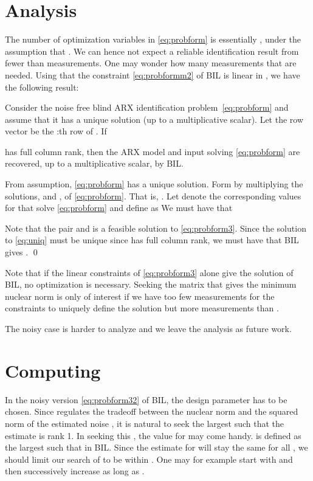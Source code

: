 \documentclass{ifacconf}
\newcommand{\0}{{\bf 0}}
\begin{document}
\section{Analysis}
The number of optimization variables  in \eqref{eq:probform} is
essentially , under the assumption that . We can
hence not expect a  reliable identification result from fewer than
  measurements. One may wonder how many measurements that
are needed. Using that the constraint \eqref{eq:probformm2} of BIL is
linear in , we have the following result:
\begin{thm}\hfill


Consider the noise free blind ARX identification
problem~\eqref{eq:probform} and assume that it has a  unique solution
(up to a multiplicative scalar).
Let the row vector  be the :th row of . 
If  

has full column rank, then the ARX model and input solving
\eqref{eq:probform}  are recovered, up to
a multiplicative scalar, by BIL.
\end{thm}
\begin{pf}
From assumption, \eqref{eq:probform} has a unique solution. Form
 by multiplying the solutions,  and , of
\eqref{eq:probform}. That is,
. Let  denote the
corresponding values for  that solve
\eqref{eq:probform} and define  as  
We must have that
 
Note that the pair  and  is a feasible solution to \eqref{eq:probform3}.  Since the solution to \eqref{eq:uniq} must be  unique since 
has full column rank, we must have that
BIL gives . 
\qed
\end{pf}
Note that if the linear constraints of
\eqref{eq:probform3} alone give the solution of BIL, no optimization
is necessary. Seeking the
matrix  that gives the minimum nuclear norm is only of interest if
we have too few measurements for the constraints to uniquely define
the solution but more
measurements than
.





The noisy case is harder to analyze and we leave the analysis as
future work.

\section{Computing }
In the noisy version \eqref{eq:probform32} of BIL, the design parameter  has to be
chosen. Since  regulates the tradeoff between the nuclear
norm and the squared norm of the estimated noise , it is natural
to seek the largest  such that the estimate  is rank
1. In seeking this , the value for  may come handy.  is defined as the largest 
such that  in BIL. Since the estimate for  will stay the
same for all , we should limit our search of
 to be within  . One may for example start
with  and then successively increase
 as long as . 
\end{document}
